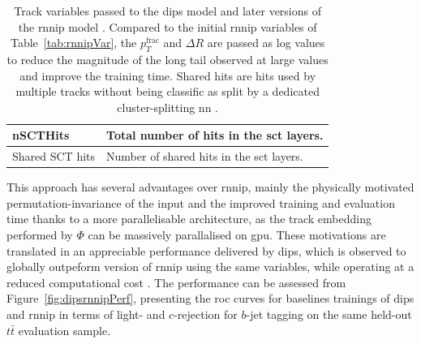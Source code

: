 \begin{table}[h]
\begin{center}
\begin{tabular}{C{3cm}|C{13cm}}
          nSCTHits          & Total number of hits in the \gls{sct} layers. \\ \hline
          Shared SCT hits   & Number of shared hits in the \gls{sct} layers.\\ \hline \hline
      \end{tabular}
      \caption{Track variables passed to the \gls{dips} model and later versions of the \gls{rnnip} model \cite{ATL-PHYS-PUB-2020-014}. Compared to the initial \gls{rnnip} variables of Table~\ref{tab:rnnipVar}, the $p_T^{\textrm{frac}}$ and $\Delta R$ are passed as log values to reduce the magnitude of the long tail observed at large values and improve the training time. Shared hits are hits used by multiple tracks without being classific as split by a dedicated cluster-splitting \gls{nn} \cite{ATLAS-tracks-algo}.}
    \label{tab:dipsVar}
  \end{center}
\end{table}

This approach has several advantages over \gls{rnnip}, mainly the physically motivated permutation-invariance of the input and the improved training and evaluation time thanks to a more parallelisable architecture, as the track embedding performed by $\Phi$ can be massively parallalised on \gls{gpu}. These motivations are translated in an appreciable performance delivered by \gls{dips}, which is observed to globally outpeform version of \gls{rnnip} using the same variables, while operating at a reduced computational cost \cite{ATL-PHYS-PUB-2020-014}. The performance can be assessed from Figure~\ref{fig:dipsrnnipPerf}, presenting the \gls{roc} curves for baselines trainings of \gls{dips} and \gls{rnnip} in terms of light- and $c$-rejection for $b$-jet tagging on the same held-out $t\bar{t}$ evaluation sample.

